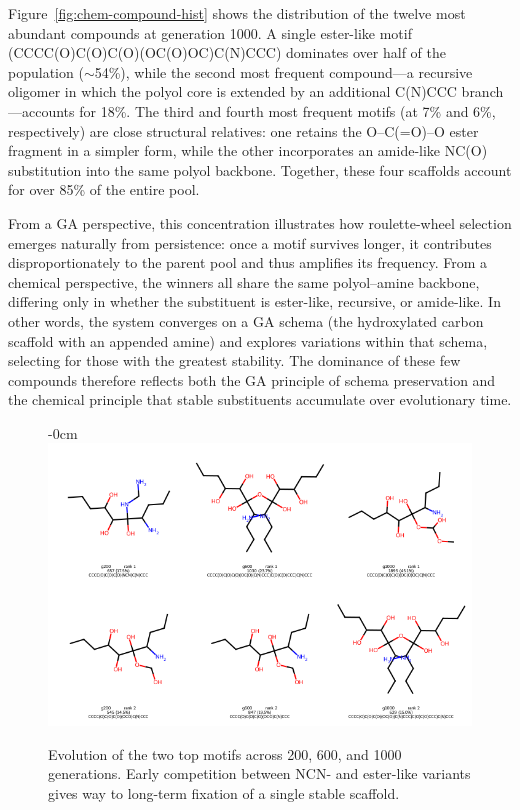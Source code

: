 \documentclass[life,article,submit,pdftex,moreauthors]{Definitions/mdpi}
\begin{document}
Figure~\ref{fig:chem-compound-hist} shows the distribution of the twelve most abundant compounds at generation 1000. A single ester-like motif (CCCC(O)C(O)C(O)(OC(O)OC)C(N)CCC) dominates over half of the population ($\sim$54\%), while the second most frequent compound---a recursive oligomer in which the polyol core is extended by an additional C(N)CCC branch---accounts for 18\%. The third and fourth most frequent motifs (at 7\% and 6\%, respectively) are close structural relatives: one retains the O–C(=O)–O ester fragment in a simpler form, while the other incorporates an amide-like NC(O) substitution into the same polyol backbone. Together, these four scaffolds account for over 85\% of the entire pool.

From a GA perspective, this concentration illustrates how roulette-wheel selection emerges naturally from persistence: once a motif survives longer, it contributes disproportionately to the parent pool and thus amplifies its frequency. From a chemical perspective, the winners all share the same polyol–amine backbone, differing only in whether the substituent is ester-like, recursive, or amide-like. In other words, the system converges on a GA schema (the hydroxylated carbon scaffold with an appended amine) and explores variations within that schema, selecting for those with the greatest stability. The dominance of these few compounds therefore reflects both the GA principle of schema preservation and the chemical principle that stable substituents accumulate over evolutionary time.

\begin{figure}[H]
    \begin{adjustwidth}{-\extralength}{0cm}
    \centering
    \includegraphics[width=1\textwidth]{SDA-chem-top-evo.png}
    \end{adjustwidth}
    \caption{Evolution of the two top motifs across 200, 600, and 1000 generations. Early competition between NCN- and ester-like variants gives way to long-term fixation of a single stable scaffold.}
    \label{fig:chem-top-evo}
\end{figure}
\end{document}
